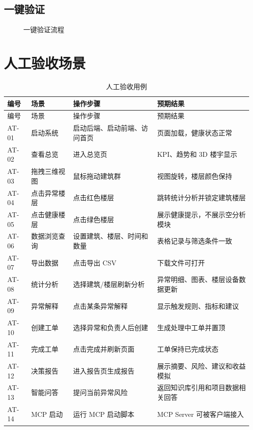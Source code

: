 \documentclass[12pt,a4paper]{ctexart}
\begin{document}
\subsection{一键验证}
\begin{figure}[H]
\centering
{}
\caption{一键验证流程}
\end{figure}

\section{人工验收场景}
\begin{longtable}{p{2cm}p{4.2cm}p{5.2cm}p{2.4cm}}
\caption{人工验收用例}\\
\toprule
编号 & 场景 & 操作步骤 & 预期结果 \\
\midrule
\endfirsthead
\toprule
编号 & 场景 & 操作步骤 & 预期结果 \\
\midrule
\endhead
AT-01 & 启动系统 & 启动后端、启动前端、访问首页 & 页面加载，健康状态正常 \\
AT-02 & 查看总览 & 进入总览页 & KPI、趋势和 3D 楼宇显示 \\
AT-03 & 拖拽三维视图 & 鼠标拖动建筑群 & 视图旋转，楼层颜色保持 \\
AT-04 & 点击异常楼层 & 点击红色楼层 & 跳转统计分析并锁定建筑楼层 \\
AT-05 & 点击健康楼层 & 点击绿色楼层 & 展示健康提示，不展示空分析模块 \\
AT-06 & 数据浏览查询 & 设置建筑、楼层、时间和数量 & 表格记录与筛选条件一致 \\
AT-07 & 导出数据 & 点击导出 CSV & 下载文件可打开 \\
AT-08 & 统计分析 & 选择建筑/楼层刷新分析 & 异常明细、图表、楼层设备数据更新 \\
AT-09 & 异常解释 & 点击某条异常解释 & 显示触发规则、指标和建议 \\
AT-10 & 创建工单 & 选择异常和负责人后创建 & 生成处理中工单并置顶 \\
AT-11 & 完成工单 & 点击完成并刷新页面 & 工单保持已完成状态 \\
AT-12 & 决策报告 & 进入报告页生成报告 & 展示摘要、风险、建议和收益模拟 \\
AT-13 & 智能问答 & 提问当前异常风险 & 返回知识库引用和项目数据相关回答 \\
AT-14 & MCP 启动 & 运行 MCP 启动脚本 & MCP Server 可被客户端接入 \\
\bottomrule
\end{longtable}
\end{document}
